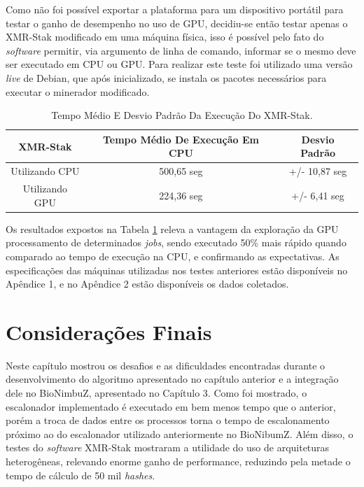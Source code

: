 Como não foi possível exportar a plataforma para um dispositivo portátil para testar o ganho de desempenho no uso de \acrshort{GPU}, decidiu-se então testar apenas o XMR-Stak modificado em uma máquina física, isso é possível pelo fato do \textit{software} permitir, via argumento de linha de comando, informar se o mesmo deve ser executado em \acrshort{CPU} ou \acrshort{GPU}. Para realizar este teste foi utilizado uma versão \textit{live} de Debian, que após inicializado, se instala os pacotes necessários para executar o minerador modificado.

\begin {table}[H]
\begin{center}
	\begin{tabular}{ |c|c|c| } 
		\hline
		XMR-Stak & Tempo Médio De Execução Em \acrshort{CPU} & Desvio Padrão \\ 
		\hline
		Utilizando \acrshort{CPU} & 500,65 seg & +/- 10,87 seg\\ 
		\hline
		Utilizando \acrshort{GPU} & 224,36 seg & +/- 6,41 seg \\ 
		\hline
	\end{tabular}
\caption {Tempo Médio E Desvio Padrão Da Execução Do XMR-Stak.} \label{TabelaTempoCPU} 
\end{center}
\end {table}

Os resultados expostos na Tabela \ref{TabelaTempoCPU} releva a vantagem da exploração da \acrshort{GPU} processamento de determinados \textit{jobs}, sendo executado 50\% mais rápido quando comparado ao tempo de execução na \acrshort{CPU}, e confirmando as expectativas. As especificações das máquinas utilizadas nos testes anteriores estão disponíveis no Apêndice 1, e no Apêndice 2 estão disponíveis os dados coletados.

\section{Considerações Finais}

Neste capítulo mostrou os desafios e as dificuldades encontradas durante o desenvolvimento do algoritmo apresentado no capítulo anterior e a integração dele no BioNimbuZ, apresentado no Capítulo 3. Como foi mostrado, o escalonador implementado é executado em bem menos tempo que o anterior, porém a troca de dados entre os processos torna o tempo de escalonamento próximo ao do escalonador utilizado anteriormente no BioNibumZ. Além disso, o testes do \textit{software} XMR-Stak mostraram a utilidade do uso de arquiteturas heterogêneas, relevando enorme ganho de performance, reduzindo pela metade o tempo de cálculo de 50 mil \textit{hashes}.

